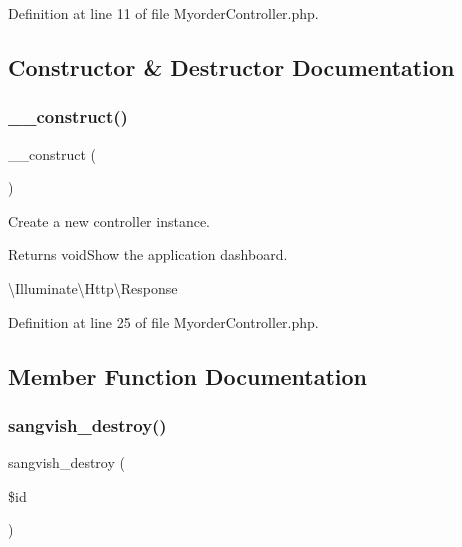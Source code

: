 Definition at line 11 of file Myorder\+Controller.\+php.



\subsection{Constructor \& Destructor Documentation}
\mbox{\label{class_responsive_1_1_http_1_1_controllers_1_1_myorder_controller_a095c5d389db211932136b53f25f39685}} 
\subsubsection{\texorpdfstring{\_\_construct()}{\_\_construct()}}
{\footnotesize\ttfamily \+\_\+\+\_\+construct (\begin{DoxyParamCaption}{ }\end{DoxyParamCaption})}

Create a new controller instance.

\begin{DoxyReturn}{Returns}
void\+Show the application dashboard.

\textbackslash{}\+Illuminate\textbackslash{}\+Http\textbackslash{}\+Response 
\end{DoxyReturn}


Definition at line 25 of file Myorder\+Controller.\+php.



\subsection{Member Function Documentation}
\mbox{\label{class_responsive_1_1_http_1_1_controllers_1_1_myorder_controller_ad99c8c5a69a0126c191ac44b8c7c88ab}} 
\subsubsection{\texorpdfstring{sangvish\_destroy()}{sangvish\_destroy()}}
{\footnotesize\ttfamily sangvish\+\_\+destroy (\begin{DoxyParamCaption}\item[{}]{\$id }\end{DoxyParamCaption})}



